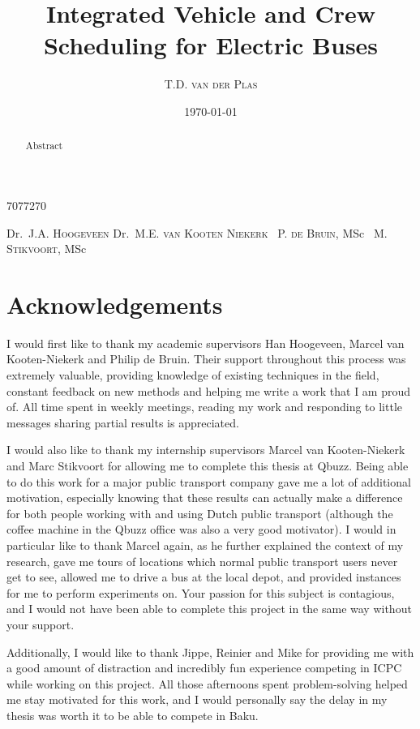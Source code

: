 \documentclass[]{article}
\begin{document}
\title{Integrated Vehicle and Crew Scheduling for Electric Buses}
\author
    {T.D. \textsc{van der Plas}} %
    {7077270}           %
\date{\today}

\supervisors
    {Dr.~J.A. \textsc{Hoogeveen}} %
    {Dr.~M.E. \textsc{van Kooten Niekerk}} %
    {~P. \textsc{de Bruin}, MSc} %
    {~M. \textsc{Stikvoort}, MSc} %



\begin{abstract}
Abstract
\end{abstract}
\newpage

\section*{Acknowledgements}
I would first like to thank my academic supervisors Han Hoogeveen, Marcel van Kooten-Niekerk and Philip de Bruin. Their support throughout this process was extremely valuable, providing knowledge of existing techniques in the field, constant feedback on new methods and helping me write a work that I am proud of. All time spent in weekly meetings, reading my work and responding to little messages sharing partial results is appreciated. 

I would also like to thank my internship supervisors Marcel van Kooten-Niekerk and Marc Stikvoort for allowing me to complete this thesis at Qbuzz. Being able to do this work for a major public transport company gave me a lot of additional motivation, especially knowing that these results can actually make a difference for both people working with and using Dutch public transport (although the coffee machine in the Qbuzz office was also a very good motivator). I would in particular like to thank Marcel again, as he further explained the context of my research, gave me tours of locations which normal public transport users never get to see, allowed me to drive a bus at the local depot, and provided instances for me to perform experiments on. Your passion for this subject is contagious, and I would not have been able to complete this project in the same way without your support. 

Additionally, I would like to thank Jippe, Reinier and Mike for providing me with a good amount of distraction and incredibly fun experience competing in ICPC while working on this project. All those afternoons spent problem-solving helped me stay motivated for this work, and I would personally say the delay in my thesis was worth it to be able to compete in Baku.
\end{document}
